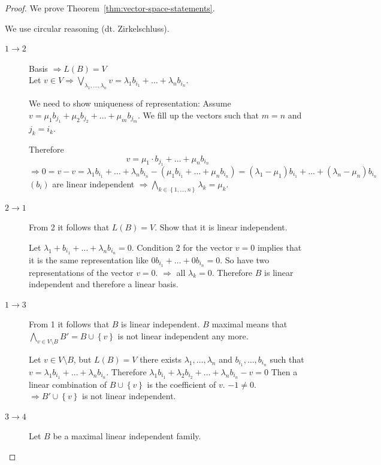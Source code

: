 \documentclass[a4paper,landscape,twocolumn]{article}
\newcommand\set[1]{\left\{#1\right\}}
\begin{document}
\begin{proof}
  We prove Theorem~\ref{thm:vector-space-statements}.

  We use circular reasoning (dt. Zirkelschluss).
  \begin{description}
    \item[$1 \rightarrow 2$]
      Basis $\Rightarrow L(B) = V$ \\
      Let $v \in V \Rightarrow \bigvee_{\lambda_1, \ldots, \lambda_n} v = \lambda_1 b_{i_1} + \ldots + \lambda_n b_{i_n}$.

      We need to show uniqueness of representation: Assume $v = \mu_1 b_{j_1} + \mu_2 b_{j_2} + \ldots + \mu_m b_{j_m}$.
      We fill up the vectors such that $m = n$ and $j_k = i_k$.

      Therefore
      \[ v = \mu_1 \cdot b_{j_1} + \ldots + \mu_n b_{i_n} \]
      \[
          \Rightarrow 0 = v - v = \lambda_1 b_{i_1} + \ldots + \lambda_n b_{i_n}
          - (\mu_1 b_{i_1} + \ldots + \mu_n b_{i_n})
          = (\lambda_1 - \mu_1) b_{i_1} + \ldots + (\lambda_n - \mu_n) b_{i_n}
      \]
      $(b_i)$ are linear independent $\Rightarrow \bigwedge_{k \in \set{1, \ldots, n}} \lambda_k = \mu_k$.
    \item[$2 \rightarrow 1$]
      From 2 it follows that $L(B) = V$.
      Show that it is linear independent.

      Let $\lambda_1 + b_{i_1} + \ldots + \lambda_n b_{i_n} = 0$.
      Condition 2 for the vector $v = 0$ implies that it is the same representation
      like $0 b_{i_1} + \ldots + 0 b_{i_n} = 0$.
      So have two representations of the vector $v = 0$.
      $\Rightarrow$ all $\lambda_k = 0$. Therefore $B$ is linear independent and therefore a linear basis.
    \item[$1 \rightarrow 3$]
      From 1 it follows that $B$ is linear independent.
      $B$ maximal means that $\bigwedge_{v \in V\setminus B} B' = B \cup \set{v}$ is not linear independent any more.

      Let $v \in V \setminus B$, but $L(B) = V$ there exists $\lambda_1, \ldots, \lambda_n$ and $b_{i_1}, \ldots, b_{i_n}$
      such that $v = \lambda_1 b_{i_1} + \ldots + \lambda_{n} b_{i_n}$.
      Therefore $\lambda_1 b_{i_1} + \lambda_2 b_{i_2} + \ldots + \lambda_n b_{i_n} - v = 0$
      Then a linear combination of $B \cup \set{v}$ is the coefficient of $v$. $-1 \neq 0$.
      $\Rightarrow B' \cup \set{v}$ is not linear independent.
    \item[$3 \rightarrow 4$]
      Let $B$ be a maximal linear independent family.


\end{description}
\end{proof}
\end{document}
